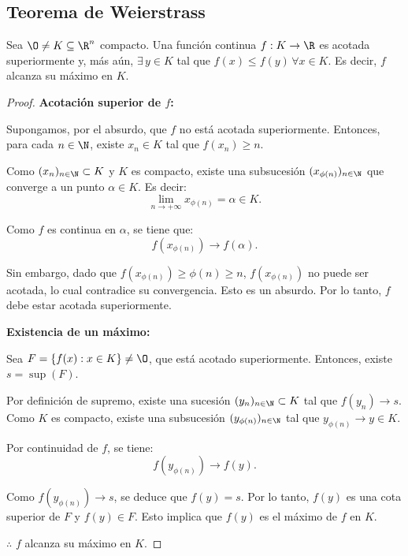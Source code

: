 \newpage

\subsection{Teorema de Weierstrass}

\begin{theorem}[Weierstrass]
    Sea \(\O \neq K \subseteq \R^n\) compacto. Una función continua \(f : K \to \R\) es acotada superiormente y, más aún, \(\exists \, y \in K\) tal que \(f(x) \leq f(y) \, \forall x \in K\).
    Es decir, \(f\) alcanza su máximo en \(K\).

    \begin{proof}
        \textbf{Acotación superior de \(f\):}

        Supongamos, por el absurdo, que \(f\) no está acotada superiormente. Entonces, para cada \(n \in \N\), existe \(x_n \in K\) tal que \(f(x_n) \geq n\).

        Como \( (x_n)_{n \in \N} \subset K \) y \(K\) es compacto, existe una subsucesión \( (x_{\phi(n)})_{n \in \N} \) que converge a un punto \(\alpha \in K\). Es decir:
        \[
            \lim_{n \to +\infty} x_{\phi(n)} = \alpha \in K.
        \]

        Como \(f\) es continua en \(\alpha\), se tiene que:
        \[
            f(x_{\phi(n)}) \to f(\alpha).
        \]

        Sin embargo, dado que \(f(x_{\phi(n)}) \geq \phi(n) \geq n\), \(f(x_{\phi(n)})\) no puede ser acotada, lo cual contradice su convergencia. Esto es un absurdo. Por lo tanto, \(f\) debe estar acotada superiormente.

        \textbf{Existencia de un máximo:}

        Sea \(F = \{f(x) : x \in K\} \neq \O\), que está acotado superiormente. Entonces, existe \(s = \sup(F)\).

        Por definición de supremo, existe una sucesión \((y_n)_{n \in \N} \subset K\) tal que \(f(y_n) \to s\). Como \(K\) es compacto, existe una subsucesión \((y_{\phi(n)})_{n \in \N}\) tal que \(y_{\phi(n)} \to y \in K\).

        Por continuidad de \(f\), se tiene:
        \[
            f(y_{\phi(n)}) \to f(y).
        \]

        Como \(f(y_{\phi(n)}) \to s\), se deduce que \(f(y) = s\). Por lo tanto, \(f(y)\) es una cota superior de \(F\) y \(f(y) \in F\). Esto implica que \(f(y)\) es el máximo de \(f\) en \(K\).

        \(\therefore\) \(f\) alcanza su máximo en \(K\).
    \end{proof}
\end{theorem}

